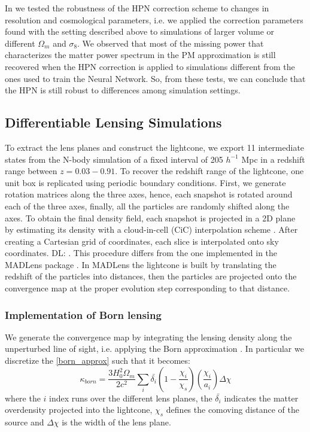 \documentclass[twocolumn,twocolappendix]{aastex63}
\newcommand{\denise}[1]{{\color{red}DL: #1}}
\begin{document}
In \citet{lanzieri2022hybrid} we tested the robustness of the HPN correction scheme to changes in resolution and cosmological parameters, i.e. we applied the correction parameters found with the setting described above to simulations of larger volume or different $\Omega_m$ and $\sigma_8$. We observed that most of the missing power that characterizes the matter power spectrum in the PM approximation is still recovered when the HPN correction is applied to simulations different from the ones used to train the Neural Network. So, from these tests, we can conclude that the HPN is still robust to differences among simulation settings.


\subsection{Differentiable Lensing Simulations}
To extract the lens planes and construct the lightcone, we export 11 intermediate states from the N-body simulation of a fixed interval of 205 $h^{-1}$ Mpc in a redshift range between $z=0.03-0.91$. 
To recover the redshift range of the lightcone, one unit box is replicated using periodic boundary conditions. First, we generate rotation matrices along the three axes, hence, each snapshot is rotated around each of the three axes, finally, all the particles are randomly shifted along the axes. 
To obtain the final density field, each snapshot is projected in a 2D plane by estimating its density with a  cloud-in-cell (CiC) interpolation scheme \citep{hockney1988computer}. After creating a Cartesian grid of coordinates, each slice is interpolated onto sky coordinates. \denise{. This procedure differs from the one implemented in the MADLens package \citep{bohm2021madlens}. In MADLens the lightcone is built by translating the redshift of the particles into distances, then the particles are projected onto the convergence map at the proper evolution step corresponding to that distance.}



\subsubsection{Implementation of Born lensing}
We generate the convergence map by integrating the lensing density along the unperturbed line of sight, i.e. applying the Born approximation \citep{schneider2006weak}. In particular we discretize the \autoref{born_approx} such that it becomes:
\begin{equation} 
    \kappa_{born}= \frac{3H_0^2 \Omega_m}{2c^2}
    \sum_i 
    \bar{\delta_i} \left ( 1-\frac{\chi_i}{\chi_s}\right)
    \left (  \frac{\chi_i}{a_i}\right)
     \Delta \chi
\end{equation}
where the $i$ index runs over the different lens planes, the $\bar{\delta_i}$ indicates the matter overdensity projected into the lightcone, $\chi_s$ defines the comoving distance of the source and $\Delta \chi$ is the  width of the lens plane. 
\end{document}
